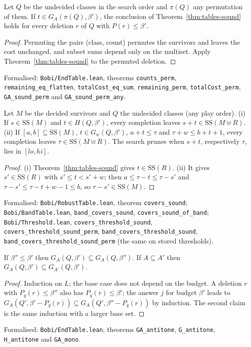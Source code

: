 \begin{proposition}\label{prop:play-order}
Let $Q$ be the undecided classes in the search order and $\pi(Q)$ any
permutation of them. If $t\in G_A(\pi(Q),\beta')$, the conclusion of
Theorem~\ref{thm:tables-sound} holds for every deletion $r$ of $Q$ with
$P(r)\le\beta'$.
\end{proposition}
\begin{proof}
Permuting the pairs (class, count) permutes the survivors and leaves the cost
unchanged, and subset sums depend only on the multiset. Apply
Theorem~\ref{thm:tables-sound} to the permuted deletion.
\end{proof}
{\raggedright\noindent Formalised: \texttt{Bobi/EndTable.lean}, theorems
\texttt{counts\_perm}, \texttt{remaining\_eq\_flatten},
\texttt{totalCost\_eq\_sum}, \texttt{remaining\_perm},
\texttt{totalCost\_perm}, \texttt{GA\_sound\_perm} and
\texttt{GA\_sound\_perm\_any}.\par}

\begin{corollary}\label{cor:root-rules}
Let $M$ be the decided survivors and $Q$ the undecided classes (any play
order). (i) If $s\in\mathrm{SS}(M)$ and $t\in H(Q,\beta')$, every completion leaves
$s+t\in\mathrm{SS}(M\uplus R)$. (ii) If $[a,b]\subseteq\mathrm{SS}(M)$, $t\in G_w(Q,\beta')$,
$a+t\le\tau$ and $\tau+w\le b+t+1$, every completion leaves
$\tau\in\mathrm{SS}(M\uplus R)$. The search prunes when $s+t$, respectively $\tau$,
lies in $[lo,hi]$.
\end{corollary}
\begin{proof}
(i) Theorem~\ref{thm:tables-sound} gives $t\in\mathrm{SS}(R)$. (ii) It gives
$s'\in\mathrm{SS}(R)$ with $s'\le t<s'+w$; then $a\le\tau-t\le\tau-s'$ and
$\tau-s'\le\tau-t+w-1\le b$, so $\tau-s'\in\mathrm{SS}(M)$.
\end{proof}
{\raggedright\noindent Formalised: \texttt{Bobi/RobustTable.lean}, theorem
\texttt{covers\_sound}; \texttt{Bobi/BandTable.lean},
\texttt{band\_covers\_sound}, \texttt{covers\_sound\_of\_band};
\texttt{Bobi/Threshold.lean}, \texttt{covers\_threshold\_sound},
\texttt{covers\_threshold\_sound\_perm}, \texttt{band\_covers\_threshold\_sound},
\texttt{band\_covers\_threshold\_sound\_perm} (the same on stored thresholds).\par}

\begin{lemma}\label{lem:antitone}
If $\beta''\le\beta'$ then $G_A(Q,\beta')\subseteq G_A(Q,\beta'')$. If
$A\subseteq A'$ then $G_A(Q,\beta')\subseteq G_{A'}(Q,\beta')$.
\end{lemma}
\begin{proof}
Induction on $L$; the base case does not depend on the budget. A deletion
$r$ with $P_q(r)\le\beta''$ also has $P_q(r)\le\beta'$; the answer $j$ for
budget $\beta'$ leads to $G_A(Q',\beta'-P_q(r))\subseteq G_A(Q',\beta''-P_q(r))$ by
induction. The second claim is the same induction with a larger base set.
\end{proof}
{\raggedright\noindent Formalised: \texttt{Bobi/EndTable.lean}, theorems
\texttt{GA\_antitone}, \texttt{G\_antitone}, \texttt{H\_antitone} and
\texttt{GA\_mono}.\par}

